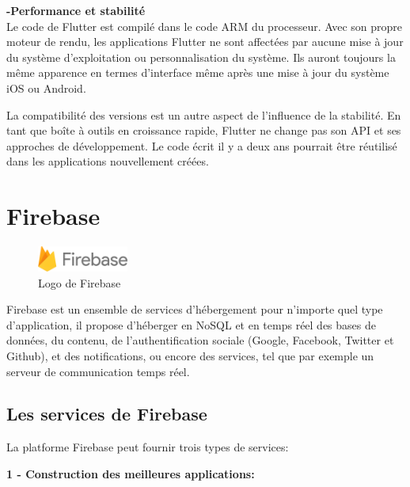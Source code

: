 \textbf{-Performance et stabilité}\\
Le code de Flutter est compilé dans le code ARM du processeur. Avec son propre moteur de rendu, les applications Flutter ne sont affectées par aucune mise à jour du système d'exploitation ou personnalisation du système. Ils auront toujours la même apparence en termes d'interface même après une mise à jour du système iOS ou Android.

La compatibilité des versions est un autre aspect de l'influence de la stabilité. En tant que boîte à outils en croissance rapide, Flutter ne change pas son API et ses approches de développement. Le code écrit il y a deux ans pourrait être réutilisé dans les applications nouvellement créées.
\bigskip

 
\newpage
\section{Firebase}
\begin{figure}
    \vspace{-15pt}
    \includegraphics[width=3cm]{images/Chapitre2/firebase_logo.png}
    \vspace{-20pt}
    \caption{{\footnotesize Logo de Firebase}}
\end{figure}
Firebase est un ensemble de services d'hébergement pour n'importe quel type d'application, il propose d'héberger en NoSQL et en temps réel des bases de données,
du contenu, de l'authentification sociale (Google, Facebook, Twitter et Github),
et des notifications, ou encore des services, tel que par exemple un serveur
de communication temps réel.~\cite{Firebase2020}
\subsection{Les services de Firebase}
La platforme Firebase peut fournir trois types de services:\bigskip

\tab \textbf{1 - Construction des meilleures applications:}\bigskip

